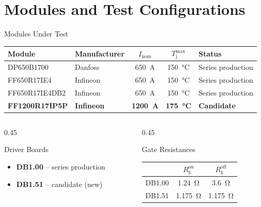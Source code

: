 \documentclass[aspectratio=169, 10pt]{beamer}
\newcommand{\good}[1]{\textcolor{goodgreen}{\textbf{#1}}}
\begin{document}
\section{Modules and Test Configurations}

\begin{frame}{Modules Under Test}
  \centering
  \renewcommand{\arraystretch}{1.5}
  \begin{tabularx}{0.92\textwidth}{l l c c l}
    \toprule
    \textbf{Module} & \textbf{Manufacturer} & $I_\text{nom}$ & $T_\text{j}^\text{max}$ & \textbf{Status} \\
    \midrule
    \rowcolor{rowgray}
    DP650B1700    & Danfoss  & \SI{650}{\ampere} & \SI{150}{\celsius} & Series production \\
    FF650R17IE4   & Infineon & \SI{650}{\ampere} & \SI{150}{\celsius} & Series production \\
    \rowcolor{rowgray}
    FF650R17IE4DB2 & Infineon & \SI{650}{\ampere} & \SI{150}{\celsius} & Series production \\
    \textbf{FF1200R17IP5P} & \textbf{Infineon} & \textbf{\SI{1200}{\ampere}} & \textbf{\SI{175}{\celsius}} & \good{Candidate} \\
    \bottomrule
  \end{tabularx}

  \vspace{10pt}
  \begin{columns}[T]
    \begin{column}{0.45\textwidth}
      \begin{block}{Driver Boards}
        \begin{itemize}
          \item \textbf{DB1.00} -- series production
          \item \textbf{DB1.51} -- candidate (new)
        \end{itemize}
      \end{block}
    \end{column}
    \begin{column}{0.45\textwidth}
      \begin{block}{Gate Resistances}
        \small
        \begin{tabular}{l c c}
          & $R_\text{g}^\text{on}$ & $R_\text{g}^\text{off}$ \\
          \midrule
          DB1.00 & \SI{1.24}{\ohm} & \SI{3.6}{\ohm} \\
          DB1.51 & \SI{1.175}{\ohm} & \SI{1.175}{\ohm} \\
        \end{tabular}
      \end{block}
    \end{column}
  \end{columns}
\end{frame}
\end{document}
